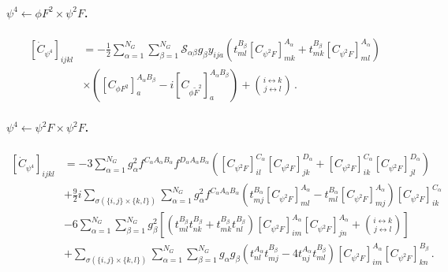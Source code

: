 \paragraph{$\psi^4 \leftarrow \phi F^2 \times \psi^2 F$.}

\begin{align}
    \left[\dot C_{\psi^4}\right]_{ijkl} &= -\frac{1}{2} \sum_{\alpha=1}^{N_G} \sum_{\beta=1}^{N_G} \mathcal S_{\alpha\beta} g_\beta y_{ija}
    \left(t^{B_\beta}_{ml} \left[C_{\psi^2 F}\right]^{A_\alpha}_{mk} + t^{B_\beta}_{mk} \left[C_{\psi^2 F}\right]^{A_\alpha}_{ml} \right)
    \nonumber \\
    &\times 
    \left(\left[C_{\phi F^2}\right]^{A_\alpha B_\beta}_a - i \left[C_{\phi \widetilde F^2}\right]^{A_\alpha B_\beta}_a\right) + \binom{i \leftrightarrow k}{j \leftrightarrow l} \,.
\end{align}

\paragraph{$\psi^4 \leftarrow \psi^2 F \times \psi^2 F$.}

\begin{align}
    \left[\dot C_{\psi^4}\right]_{ijkl} &=
    -3 \sum_{\alpha=1}^{N_G} g_\alpha^2 f^{C_\alpha A_\alpha B_\alpha} f^{D_\alpha A_\alpha B_\alpha} \left(
    \left[C_{\psi^2 F}\right]_{il}^{C_\alpha} \left[C_{\psi^2 F}\right]_{jk}^{D_\alpha} + \left[C_{\psi^2 F}\right]_{ik}^{C_\alpha} \left[C_{\psi^2 F}\right]_{jl}^{D_\alpha}\right) 
    \nonumber \\
    &+ \frac{9}{2}i \sum_{\sigma(\{i,j\}\times\{k,l\})} \sum_{\alpha=1}^{N_G} g_\alpha^2 f^{C_\alpha A_\alpha B_\alpha}
    \left(
    t^{B_\alpha}_{mj} \left[C_{\psi^2 F}\right]_{ml}^{A_\alpha} - t^{B_\alpha}_{ml} \left[C_{\psi^2 F}\right]_{mj}^{A_\alpha}
    \right) \left[C_{\psi^2 F}\right]_{ik}^{C_\alpha}\nonumber \\
    &-6\sum_{\alpha=1}^{N_G}\sum_{\beta=1}^{N_G} g_\beta^2
    \left[
    \left( 
    t^{B_\beta}_{ml}t^{B_\beta}_{nk}+t^{B_\beta}_{mk}t^{B_\beta}_{nl}
    \right) \left[C_{\psi^2 F}\right]_{im}^{A_\alpha} \left[C_{\psi^2 F}\right]_{jn}^{A_\alpha}+\binom{i\leftrightarrow k}{j\leftrightarrow l}
    \right]\nonumber \\
    &+\sum_{\sigma(\{i,j\}\times\{k,l\})} \sum_{\alpha=1}^{N_G}\sum_{\beta=1}^{N_G} g_\alpha g_\beta \left(
    t^{A_\alpha}_{nl}t^{B_\beta}_{mj}-4t^{A_\alpha}_{nj}t^{B_\beta}_{ml}
    \right)
    \left[C_{\psi^2 F}\right]_{im}^{A_\alpha}
    \left[C_{\psi^2 F}\right]_{kn}^{B_\beta} \,.
\end{align}

